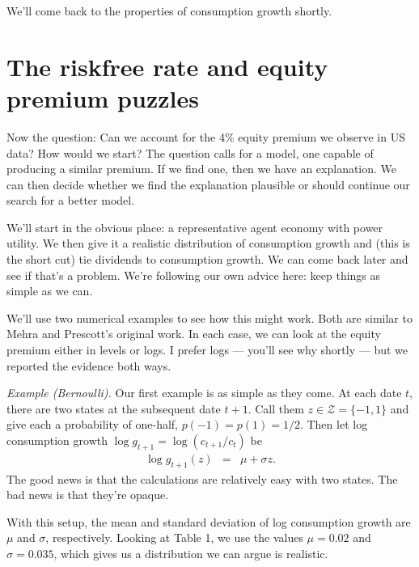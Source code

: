\documentclass[11pt]{article}
\begin{document}
We'll come back to the properties of consumption growth shortly.


\section{The riskfree rate and equity premium puzzles}
\label{sec:equity-premium}

Now the question:  Can we account for the 4\% equity premium we observe in US data?
How would we start?
The question calls for a model, one capable of producing a similar premium.
If we find one, then we have an explanation.
We can then decide whether we find the explanation plausible
or should continue our search for a better model.

We'll start in the obvious place: a representative agent economy
with power utility.
We then give it a realistic distribution of consumption growth
and (this is the short cut) tie dividends to consumption growth.
We can come back later and see if that's a problem.
We're following our own advice here:
keep things as simple as we can.

We'll use two numerical examples to see how this might work.
Both are similar to Mehra and Prescott's original work.
In each case, we can look at the equity premium either in levels or logs.
I prefer logs --- you'll see why shortly --- but we reported the evidence both ways.

{\it Example (Bernoulli).}
Our first example is as simple as they come.
At each date $t$, there are two states at the subsequent date $t+1$.
Call them $ z \in \mathcal{Z} = \{-1, 1\}$ and give each
a probability of one-half, $p(-1) = p(1) = 1/2$.
Then let  log consumption growth $\log g_{t+1} = \log (c_{t+1}/c_t)$ be
\begin{eqnarray*}
    \log g_{t+1}(z) &=& \mu + \sigma z .
\end{eqnarray*}
The good news is that the calculations are relatively easy with two states.
The bad news is that they're opaque.

With this setup, the mean and standard deviation of log consumption growth
are $\mu$ and $\sigma$, respectively.
Looking at Table 1, we use the values $\mu = 0.02$ and $\sigma = 0.035$,
which gives us a distribution we can argue is realistic.
\end{document}
